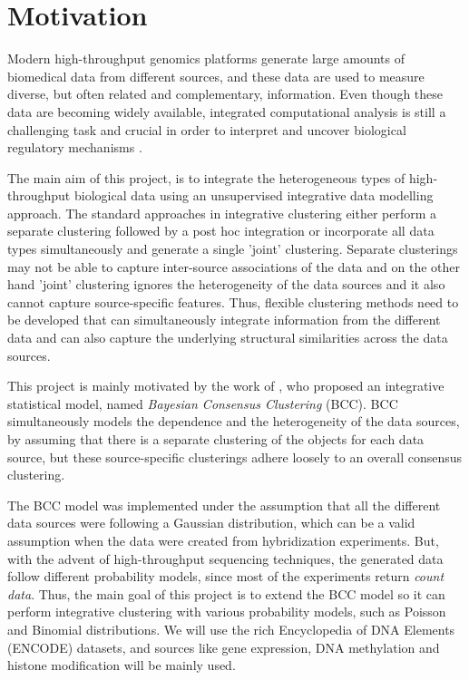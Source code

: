 \section{Motivation} \label{motivation-intro-l}
Modern high-throughput genomics platforms generate large amounts of biomedical data from different sources, and these data are used to measure diverse, but often related and complementary, information. Even though these data are becoming widely available, integrated computational analysis is still a challenging task and crucial in order to interpret and uncover biological regulatory mechanisms \cite{Park2009}. 

The main aim of this project, is to integrate the heterogeneous types of high-throughput biological data using an unsupervised integrative data modelling approach. The standard approaches in integrative clustering either perform a separate clustering followed by a post hoc integration or incorporate all data types simultaneously and generate a single 'joint' clustering. Separate clusterings may not be able to capture inter-source associations of the data and on the other hand 'joint' clustering ignores the heterogeneity of the data sources and it also cannot capture source-specific features. Thus, flexible clustering methods need to be developed that can simultaneously integrate information from the different data and can also capture the underlying structural similarities across the data sources.

This project is mainly motivated by the work of \cite{Lock2013}, who proposed an integrative statistical model, named \emph{Bayesian Consensus Clustering} (BCC). BCC simultaneously models the dependence and the heterogeneity of the data sources, by assuming that there is a separate clustering of the objects for each data source, but these source-specific clusterings adhere loosely to an overall consensus clustering. 

The BCC model was implemented under the assumption that all the different data sources were following a Gaussian distribution, which can be a valid assumption when the data were created from hybridization experiments. But, with the advent of high-throughput sequencing techniques, the generated data follow different probability models, since most of the experiments return \emph{count data}. Thus, the main goal of this project is to extend the BCC model so it can perform integrative clustering with various probability models, such as Poisson and Binomial distributions. We will use the rich Encyclopedia of DNA Elements (ENCODE) \cite{Dunham2012} datasets, and sources like gene expression, DNA methylation and histone modification will be mainly used.